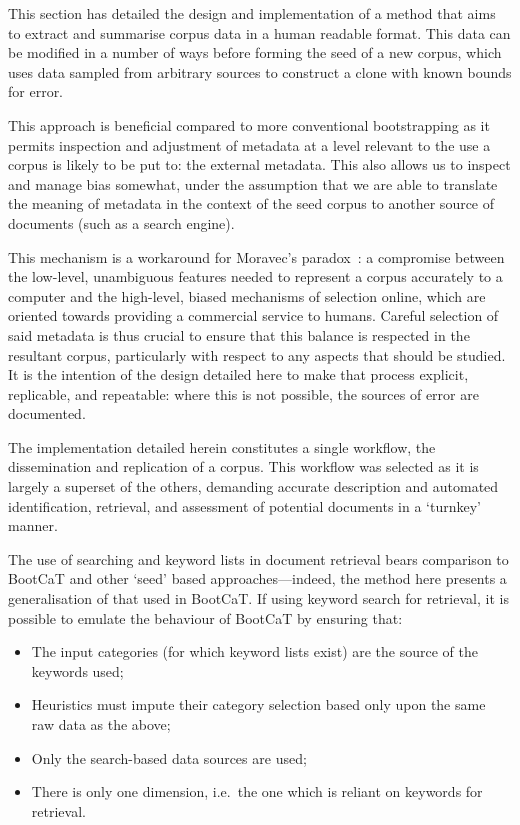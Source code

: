 

This section has detailed the design and implementation of a method that aims to extract and summarise corpus data in a human readable format.  This data can be modified in a number of ways before forming the seed of a new corpus, which uses data sampled from arbitrary sources to construct a clone with known bounds for error.

This approach is beneficial compared to more conventional bootstrapping as it permits inspection and adjustment of metadata at a level relevant to the use a corpus is likely to be put to: the external metadata.  This also allows us to inspect and manage bias somewhat, under the assumption that we are able to translate the meaning of metadata in the context of the seed corpus to another source of documents (such as a search engine).

This mechanism is a workaround for Moravec's paradox~\cite{moravec1988mind}: a compromise between the low-level, unambiguous features needed to represent a corpus accurately to a computer and the high-level, biased mechanisms of selection online, which are oriented towards providing a commercial service to humans.  Careful selection of said metadata is thus crucial to ensure that this balance is respected in the resultant corpus, particularly with respect to any aspects that should be studied.  It is the intention of the design detailed here to make that process explicit, replicable, and repeatable: where this is not possible, the sources of error are documented.

The implementation detailed herein constitutes a single workflow, the dissemination and replication of a corpus.  This workflow was selected as it is largely a superset of the others, demanding accurate description and automated identification, retrieval, and assessment of potential documents in a `turnkey' manner.




The use of searching and keyword lists in document retrieval bears comparison to BootCaT and other `seed' based approaches---indeed, the method here presents a generalisation of that used in BootCaT.  If using keyword search for retrieval, it is possible to emulate the behaviour of BootCaT by ensuring that:

\begin{itemize}
    \item The input categories (for which keyword lists exist) are the source of the keywords used;
    \item Heuristics must impute their category selection based only upon the same raw data as the above;
    \item Only the search-based data sources are used;
    \item There is only one dimension, i.e.\ the one which is reliant on keywords for retrieval.
\end{itemize}

